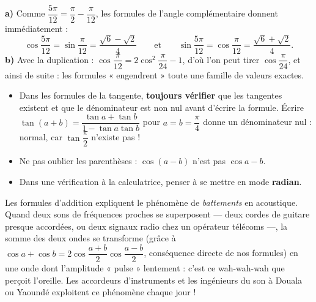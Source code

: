 \documentclass[11pt]{article}
\begin{document}
\begin{exemplebox}
\textbf{a)} Comme $\dfrac{5\pi}{12} = \dfrac{\pi}{2} - \dfrac{\pi}{12}$, les formules de l'angle complémentaire donnent immédiatement :
\[ \cos\frac{5\pi}{12} = \sin\frac{\pi}{12} = \frac{\sqrt{6}-\sqrt{2}}{4} \qquad \text{et} \qquad \sin\frac{5\pi}{12} = \cos\frac{\pi}{12} = \frac{\sqrt{6}+\sqrt{2}}{4}. \]
\textbf{b)} Avec la duplication : $\cos\dfrac{\pi}{12} = 2\cos^2\dfrac{\pi}{24} - 1$, d'où l'on peut tirer $\cos\dfrac{\pi}{24}$, et ainsi de suite : les formules « engendrent » toute une famille de valeurs exactes.
\end{exemplebox}

\begin{attention}
\begin{itemize}
\item Dans les formules de la tangente, \textbf{toujours vérifier} que les tangentes existent et que le dénominateur est non nul avant d'écrire la formule. Écrire $\tan(a+b) = \dfrac{\tan a + \tan b}{1 - \tan a \tan b}$ pour $a = b = \dfrac{\pi}{4}$ donne un dénominateur nul : normal, car $\tan\dfrac{\pi}{2}$ n'existe pas !
\item Ne pas oublier les parenthèses : $\cos(a-b)$ n'est pas $\cos a - b$.
\item Dans une vérification à la calculatrice, penser à se mettre en mode \textbf{radian}.
\end{itemize}
\end{attention}

\begin{savaistu}
Les formules d'addition expliquent le phénomène de \emph{battements} en acoustique. Quand deux sons de fréquences proches se superposent — deux cordes de guitare presque accordées, ou deux signaux radio chez un opérateur télécoms —, la somme des deux ondes se transforme (grâce à $\cos a + \cos b = 2\cos\dfrac{a+b}{2}\cos\dfrac{a-b}{2}$, conséquence directe de nos formules) en une onde dont l'amplitude « pulse » lentement : c'est ce wah-wah-wah que perçoit l'oreille. Les accordeurs d'instruments et les ingénieurs du son à Douala ou Yaoundé exploitent ce phénomène chaque jour !
\end{savaistu}
\end{document}
